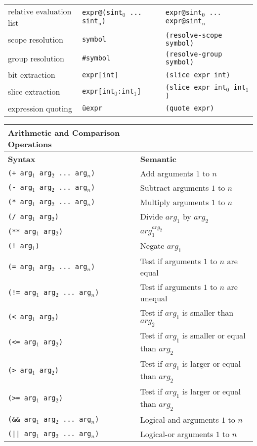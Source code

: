 \documentclass[9pt]{article}
\begin{document}
\begin{table*}[h]
\begin{tabular}{lll}
    relative evaluation list & \texttt{expr@(sint$_\text{0}$ ... sint$_\text{n}$)}        & \texttt{expr@sint$_\text{0}$ ... expr@sint$_\text{n}$}        \\    
    scope resolution         & \texttt{\raisebox{0.5ex}{\texttildelow}symbol}    & \texttt{(resolve-scope symbol)}         \\
    group resolution         & \texttt{\#symbol}                                 & \texttt{(resolve-group symbol)}         \\
    bit extraction           & \texttt{expr[int]}                          & \texttt{(slice expr int)}         \\
    slice extraction         & \texttt{expr[int$_\text{0}$:int$_\text{1}$]} & \texttt{(slice expr int$_\text{0}$ int$_\text{1}$)} \\
    expression quoting       & \texttt{üexpr} & \texttt{(quote expr)} \\
    \bottomrule
  \end{tabular}
\end{table*}

\begin{table*}[h]
  \centering
  \begin{tabular}{ll}
    \toprule
    {\large {\bf Arithmetic and Comparison Operations}} & \\ \toprule
    {\bf Syntax} & {\bf Semantic} \\ \toprule
    {\tt (+ arg$_1$ arg$_2$ ... arg$_n$)}       & Add arguments $1$ to $n$  \\
    {\tt (- arg$_1$ arg$_2$ ... arg$_n$)}       & Subtract arguments $1$ to $n$  \\
    {\tt (* arg$_1$ arg$_2$ ... arg$_n$)}       & Multiply arguments $1$ to $n$  \\
    {\tt (/ arg$_1$ arg$_2$)}       & Divide $arg_1$ by $arg_2$ \\
    {\tt (** arg$_1$ arg$_2$)}      & $arg_1^{arg_2}$ \\
    {\tt (! arg$_1$)}       & Negate $arg_1$ \\
    {\tt (= arg$_1$ arg$_2$ ... arg$_n$)}       & Test if arguments $1$ to $n$ are equal  \\
    {\tt (!= arg$_1$ arg$_2$ ... arg$_n$)}       & Test if arguments $1$ to $n$ are unequal  \\
    {\tt (< arg$_1$ arg$_2$)}      & Test if $arg_1$ is smaller than $arg_2$\\
    {\tt (<= arg$_1$ arg$_2$)}      & Test if $arg_1$ is smaller or equal than $arg_2$\\
    {\tt (> arg$_1$ arg$_2$)}      & Test if $arg_1$ is larger or equal than $arg_2$\\
    {\tt (>= arg$_1$ arg$_2$)}      & Test if $arg_1$ is larger or equal than $arg_2$\\
    {\tt (\&\& arg$_1$ arg$_2$ ... arg$_n$)}       & Logical-and arguments $1$ to $n$  \\
    {\tt (|| arg$_1$ arg$_2$ ... arg$_n$)}       & Logical-or arguments $1$ to $n$  \\
    \bottomrule
  \end{tabular}
\end{table*}
\end{document}
